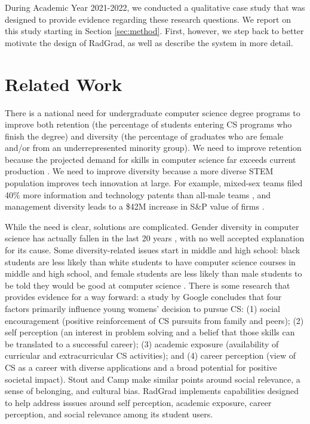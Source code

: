 \documentclass[acmsmall]{acmart}
\begin{document}
During Academic Year 2021-2022, we conducted a qualitative case study that was designed to provide evidence regarding these research questions.  We report on this study starting in Section \ref{sec:method}. First, however, we step back to better motivate the design of RadGrad, as well as describe the system in more detail.

\section{Related Work}
\label{sec:related-work}

There is a national need for undergraduate computer science degree programs to improve both retention (the percentage of students entering CS programs who finish the degree) and diversity (the percentage of graduates who are female and/or from an underrepresented minority group).  We need to improve retention because the projected demand for skills in computer science far exceeds current production \cite{camp_generation_2017}.  We need to improve diversity because a more diverse STEM population improves tech innovation at large. For example, mixed-sex teams filed 40\% more information and technology patents than all-male teams \cite{ashcraft_who_2012}, and management diversity leads to a \$42M increase in S\&P value of firms \cite{dezso_girl_2007}.

While the need is clear, solutions are complicated. Gender diversity in computer science has actually fallen in the last 20 years \cite{hong_women_2014}, with no well accepted explanation for its cause. Some diversity-related issues start in middle and high school: black students are less likely than white students to have computer science courses in middle and high school, and female students are less likely than male students to be told they would be good at computer science \cite{inc_diversity_2016}.   There is some research that provides evidence for a way forward: a study by Google \cite{hong_women_2014} concludes that four factors primarily influence young womens' decision to pursue CS: (1) social encouragement (positive reinforcement of CS pursuits from family and peers); (2) self perception (an interest in problem solving and a belief that those skills can be translated to a successful career); (3) academic exposure (availability of curricular and extracurricular CS activities); and (4) career perception (view of CS as a career with diverse applications and a broad potential for positive societal impact). Stout and Camp \cite{stout_now_2014} make similar points around social relevance, a sense of belonging, and cultural bias. RadGrad implements capabilities designed to help address isssues around self perception, academic exposure, career perception, and social relevance among its student users.
\end{document}
